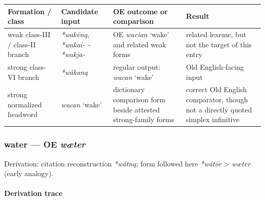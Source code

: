 \documentclass[
  british,
  a4paper,
]{article}
\newcounter{none} %
\begin{document}
{\def\LTcaptype{none} %
\begin{longtable}[]{@{}
  >{\raggedright\arraybackslash}p{}
  >{\raggedright\arraybackslash}p{}
  >{\raggedright\arraybackslash}p{}
  >{\raggedright\arraybackslash}p{}@{}}
\toprule\noalign{}
\begin{minipage}[b]{\linewidth}\raggedright
Formation / class
\end{minipage} & \begin{minipage}[b]{\linewidth}\raggedright
Candidate input
\end{minipage} & \begin{minipage}[b]{\linewidth}\raggedright
OE outcome or comparison
\end{minipage} & \begin{minipage}[b]{\linewidth}\raggedright
Result
\end{minipage} \\
\midrule\noalign{}
\endhead
\bottomrule\noalign{}
\endlastfoot
weak class-III / class-II branch & {\emph{*wakēną}}, \emph{*wakai-}
\textasciitilde{} \emph{*wakja-} & OE {\emph{wacian}} `wake' and related
weak forms & related lexeme, but not the target of this entry \\
strong class-VI branch & {\emph{*wákaną}} & regular output:
{\emph{wacan}} `wake' & Old English-facing input \\
strong normalized headword & {\emph{wacan}} `wake' & dictionary
comparison form beside attested strong-family forms & correct Old
English comparator, though not a directly quoted simplex infinitive \\
\end{longtable}
}

\subsubsection{\texorpdfstring{water --- OE
\emph{wæter}}{water --- OE wæter}}\label{water-oe-wuxe6ter}

Derivation: citation reconstruction \emph{*wátną}; form followed here
\emph{*wátōr} \textgreater{} \emph{wæter} (early analogy).

\paragraph{Derivation trace}\label{derivation-trace-116}
\end{document}
